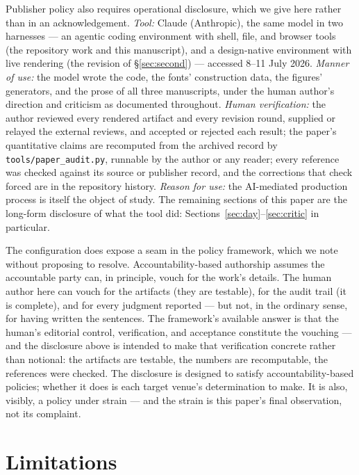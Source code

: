 \documentclass[11pt]{article}
\begin{document}
Publisher policy also requires operational disclosure, which we give here rather than in an acknowledgement. \emph{Tool:} Claude (Anthropic), the same model in two harnesses — an agentic coding environment with shell, file, and browser tools (the repository work and this manuscript), and a design-native environment with live rendering (the revision of \S\ref{sec:second}) — accessed 8--11 July 2026. \emph{Manner of use:} the model wrote the code, the fonts' construction data, the figures' generators, and the prose of all three manuscripts, under the human author's direction and criticism as documented throughout. \emph{Human verification:} the author reviewed every rendered artifact and every revision round, supplied or relayed the external reviews, and accepted or rejected each result; the paper's quantitative claims are recomputed from the archived record by \texttt{tools/paper\_audit.py}, runnable by the author or any reader; every reference was checked against its source or publisher record, and the corrections that check forced are in the repository history. \emph{Reason for use:} the AI-mediated production process is itself the object of study. The remaining sections of this paper are the long-form disclosure of what the tool did: Sections~\ref{sec:day}--\ref{sec:critic} in particular.

The configuration does expose a seam in the policy framework, which we note without proposing to resolve. Accountability-based authorship assumes the accountable party can, in principle, vouch for the work's details. The human author here can vouch for the artifacts (they are testable), for the audit trail (it is complete), and for every judgment reported — but not, in the ordinary sense, for having written the sentences. The framework's available answer is that the human's editorial control, verification, and acceptance constitute the vouching — and the disclosure above is intended to make that verification concrete rather than notional: the artifacts are testable, the numbers are recomputable, the references were checked. The disclosure is designed to satisfy accountability-based policies; whether it does is each target venue's determination to make. It is also, visibly, a policy under strain — and the strain is this paper's final observation, not its complaint.

\section{Limitations}\label{sec:limits}
\end{document}
